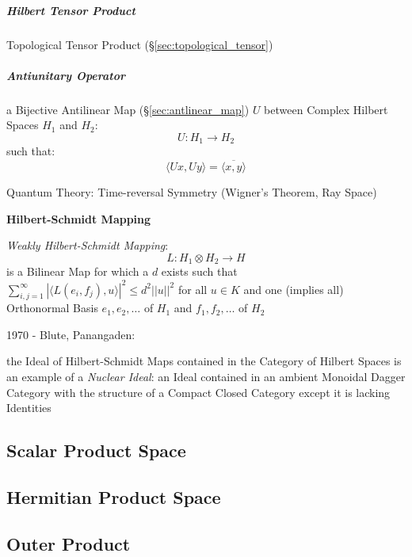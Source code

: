 \subparagraph{Hilbert Tensor Product}\label{sec:hilbert_tensor}\hfill

Topological Tensor Product (\S\ref{sec:topological_tensor})



\subparagraph{Antiunitary Operator}\label{sec:antiunitary_operator}\hfill

a Bijective Antilinear Map (\S\ref{sec:antlinear_map}) $U$ between Complex
Hilbert Spaces $H_1$ and $H_2$:
\[
  U : H_1 \rightarrow H_2
\]
such that:
\[
  \langle{Ux,Uy}\rangle = \overline{\langle{x,y}\rangle}
\]

Quantum Theory: Time-reversal Symmetry (Wigner's Theorem, Ray Space) %



\textbf{Hilbert-Schmidt Mapping}

\emph{Weakly Hilbert-Schmidt Mapping}:
\[
  L : H_1 \otimes H_2 \rightarrow H
\]
is a Bilinear Map for which a $d$ exists such that
$\sum_{i,j=1}^\infty | \langle L(e_i,f_j), u \rangle |^2 \leq d^2
||u||^2$ for all $u \in K$ and one (implies all) Orthonormal Basis
$e_1, e_2, \ldots$ of $H_1$ and $f_1, f_2, \ldots$ of $H_2$


1970 - Blute, Panangaden:

the Ideal of Hilbert-Schmidt Maps contained in the Category of Hilbert
Spaces is an example of a \emph{Nuclear Ideal}: an Ideal contained in
an ambient Monoidal Dagger Category with the structure of a Compact
Closed Category except it is lacking Identities



\subsection{Scalar Product Space}\label{sec:scalar_product_space}

\subsection{Hermitian Product Space}\label{sec:hermitian_product_space}

\subsection{Outer Product}\label{sec:outer_product}


